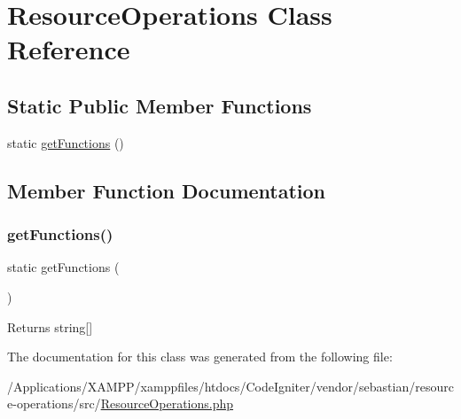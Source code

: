 \hypertarget{class_sebastian_bergmann_1_1_resource_operations_1_1_resource_operations}{}\section{Resource\+Operations Class Reference}
\label{class_sebastian_bergmann_1_1_resource_operations_1_1_resource_operations}
\subsection*{Static Public Member Functions}
\begin{DoxyCompactItemize}
\item 
static \mbox{\hyperlink{class_sebastian_bergmann_1_1_resource_operations_1_1_resource_operations_a45555e471b2be1b2fe35339d663e532d}{get\+Functions}} ()
\end{DoxyCompactItemize}


\subsection{Member Function Documentation}
\mbox{\label{class_sebastian_bergmann_1_1_resource_operations_1_1_resource_operations_a45555e471b2be1b2fe35339d663e532d}} 
\subsubsection{\texorpdfstring{get\+Functions()}{getFunctions()}}
{\footnotesize\ttfamily static get\+Functions (\begin{DoxyParamCaption}{ }\end{DoxyParamCaption})\hspace{0.3cm}{\ttfamily [static]}}

\begin{DoxyReturn}{Returns}
string\mbox{[}\mbox{]} 
\end{DoxyReturn}


The documentation for this class was generated from the following file\+:\begin{DoxyCompactItemize}
\item 
/\+Applications/\+X\+A\+M\+P\+P/xamppfiles/htdocs/\+Code\+Igniter/vendor/sebastian/resource-\/operations/src/\mbox{\hyperlink{_resource_operations_8php}{Resource\+Operations.\+php}}\end{DoxyCompactItemize}
